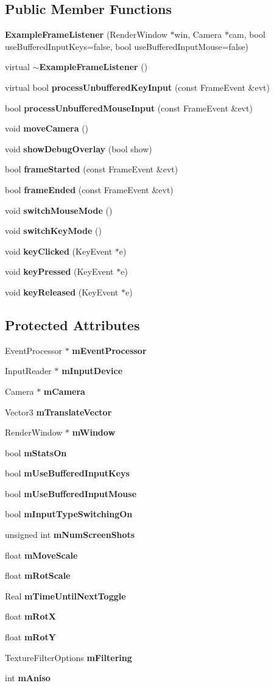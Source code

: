 \subsection*{Public Member Functions}
\begin{CompactItemize}
\item 
{\bf Example\-Frame\-Listener} (Render\-Window $\ast$win, Camera $\ast$cam, bool use\-Buffered\-Input\-Keys=false, bool use\-Buffered\-Input\-Mouse=false)
\item 
virtual {\bf $\sim$Example\-Frame\-Listener} ()
\item 
virtual bool {\bf process\-Unbuffered\-Key\-Input} (const Frame\-Event \&evt)
\item 
bool {\bf process\-Unbuffered\-Mouse\-Input} (const Frame\-Event \&evt)
\item 
void {\bf move\-Camera} ()
\item 
void {\bf show\-Debug\-Overlay} (bool show)
\item 
bool {\bf frame\-Started} (const Frame\-Event \&evt)
\item 
bool {\bf frame\-Ended} (const Frame\-Event \&evt)
\item 
void {\bf switch\-Mouse\-Mode} ()
\item 
void {\bf switch\-Key\-Mode} ()
\item 
void {\bf key\-Clicked} (Key\-Event $\ast$e)
\item 
void {\bf key\-Pressed} (Key\-Event $\ast$e)
\item 
void {\bf key\-Released} (Key\-Event $\ast$e)
\end{CompactItemize}
\subsection*{Protected Attributes}
\begin{CompactItemize}
\item 
Event\-Processor $\ast$ {\bf m\-Event\-Processor}
\item 
Input\-Reader $\ast$ {\bf m\-Input\-Device}
\item 
Camera $\ast$ {\bf m\-Camera}
\item 
Vector3 {\bf m\-Translate\-Vector}
\item 
Render\-Window $\ast$ {\bf m\-Window}
\item 
bool {\bf m\-Stats\-On}
\item 
bool {\bf m\-Use\-Buffered\-Input\-Keys}
\item 
bool {\bf m\-Use\-Buffered\-Input\-Mouse}
\item 
bool {\bf m\-Input\-Type\-Switching\-On}
\item 
unsigned int {\bf m\-Num\-Screen\-Shots}
\item 
float {\bf m\-Move\-Scale}
\item 
float {\bf m\-Rot\-Scale}
\item 
Real {\bf m\-Time\-Until\-Next\-Toggle}
\item 
float {\bf m\-Rot\-X}
\item 
float {\bf m\-Rot\-Y}
\item 
Texture\-Filter\-Options {\bf m\-Filtering}
\item 
int {\bf m\-Aniso}
\end{CompactItemize}
